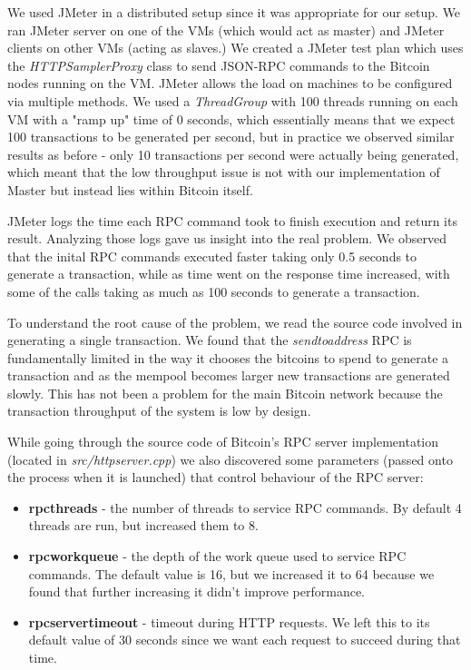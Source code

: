 We used JMeter in a distributed setup \cite{jmeterDistributed} since it was appropriate for our setup. We ran JMeter server on one of the VMs (which would act as master) and JMeter clients on other VMs (acting as slaves.) We created a JMeter test plan which uses the \textit{HTTPSamplerProxy} class to send JSON-RPC commands to the Bitcoin nodes running on the VM. JMeter allows the load on machines to be configured via multiple methods. We used a \textit{ThreadGroup} with 100 threads running on each VM with a "ramp up" time of 0 seconds, which essentially means that we expect 100 transactions to be generated per second, but in practice we observed similar results as before - only 10 transactions per second were actually being generated, which meant that the low throughput issue is not with our implementation of Master but instead lies within Bitcoin itself.

JMeter logs the time each RPC command took to finish execution and return its result. Analyzing those logs gave us insight into the real problem. We observed that the inital RPC commands executed faster taking only 0.5 seconds to generate a transaction, while as time went on the response time increased, with some of the calls taking as much as 100 seconds to generate a transaction. 

To understand the root cause of the problem, we read the source code involved in generating a single transaction. We found that the \textit{sendtoaddress} RPC is fundamentally limited in the way it chooses the bitcoins to spend to generate a transaction and as the mempool becomes larger new transactions are generated slowly. This has not been a problem for the main Bitcoin network because the transaction throughput of the system is low by design.


While going through the source code of Bitcoin's RPC server implementation (located in \textit{src/httpserver.cpp}) we also discovered some parameters (passed onto the process when it is launched) that control behaviour of the RPC server:

\begin{itemize}
    \item \textbf{rpcthreads} - the number of threads to service RPC commands. By default 4 threads are run, but increased them to 8.
    
    \item \textbf{rpcworkqueue} - the depth of the work queue used to service RPC commands. The default value is 16, but we increased it to 64 because we found that further increasing it didn't improve performance.
    
    \item \textbf{rpcservertimeout} - timeout during HTTP requests. We left this to its default value of 30 seconds since we want each request to succeed during that time.
\end{itemize}

